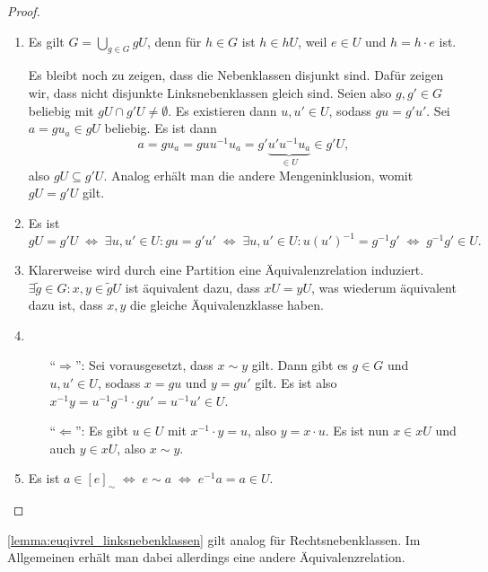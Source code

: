 \begin{proof}{\ }
    \begin{enumerate}
        \item Es gilt $G = \bigcup_{g \in G} gU$, denn für $h \in G$ ist $h \in hU$, weil $e \in U$ und $h = h \cdot e$ ist. 
        
        Es bleibt noch zu zeigen, dass die Nebenklassen disjunkt sind. Dafür zeigen wir, dass nicht disjunkte Linksnebenklassen gleich sind. Seien also $g, g' \in G$ beliebig mit $gU \cap g'U \not= \emptyset$. Es existieren dann $u, u' \in U$, sodass $g u = g' u'$. Sei $a = g  u_a \in gU$ beliebig. Es ist dann $$ a = g u_a = g u u^{-1} u_a = g' \underbrace{u' u^{-1} u_a}_{\in U} \in g'U, $$
        also $gU \subseteq g'U$. Analog erhält man die andere Mengeninklusion, womit $gU = g'U$ gilt.
        \item Es ist 
        $$gU = g'U \;\Leftrightarrow\; \exists u, u' \in U: gu = g'u' \;\Leftrightarrow\; \exists u, u' \in U: u\left(u'\right)^{-1} = g^{-1}g' \;\Leftrightarrow\; g^{-1}g' \in U.$$
        \item Klarerweise wird durch eine Partition eine Äquivalenzrelation induziert. $\exists \tilde{g} \in G: x,y \in \tilde{g}U$ ist äquivalent dazu, dass $xU = yU$, was wiederum äquivalent dazu ist, dass $x, y$ die gleiche Äquivalenzklasse haben.
        \item \begin{itemize}[leftmargin=1cm]
            \item[``$\Rightarrow$'':] Sei vorausgesetzt, dass $x\sim y$ gilt. Dann gibt es $g\in G$ und $u, u' \in U$, sodass $x = g u$ und $y = g u'$ gilt. Es ist also $x^{-1} y = u^{-1} g^{-1} \cdot g  u' = u^{-1} u' \in U$.
            \item[``$\Leftarrow$'':] Es gibt $u\in U$ mit $x^{-1}\cdot y = u$, also $y = x\cdot u$.  Es ist nun $x \in xU$ und auch  $y \in xU$, also $x \sim y$. 
        \end{itemize}
        \item Es ist $a \in [e]_\sim \;\Leftrightarrow\; e \sim a \;\Leftrightarrow\; e^{-1} a = a \in U $.
    \end{enumerate}
\end{proof}

\begin{remark}
    \cref{lemma:euqivrel_linksnebenklassen} gilt analog für Rechtsnebenklassen. Im Allgemeinen erhält man dabei allerdings eine andere Äquivalenzrelation.
\end{remark}

